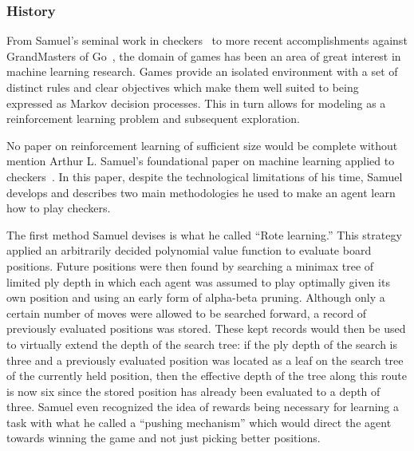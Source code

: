 

\subsubsection{History}

From Samuel's seminal work in checkers~\cite{samuel_checkers}
to more recent accomplishments against GrandMasters of
Go~\cite{deepmind_alphago},
the domain of games has been an area of great interest in machine learning
research.
%
Games provide an isolated environment with a set of distinct rules and clear
objectives which make them well suited to being expressed as Markov decision
processes.
%
This in turn allows for modeling as a reinforcement learning problem and
subsequent exploration.



No paper on reinforcement learning of sufficient size would be complete without
mention Arthur L. Samuel's foundational paper on machine learning applied to
checkers~\cite{samuel_checkers}.
%
In this paper,
despite the technological limitations of his time,
Samuel develops and describes two main methodologies he used to make an agent
learn how to play checkers.

The first method Samuel devises is what he called ``Rote learning.''
%
This strategy applied an arbitrarily decided polynomial value function
to evaluate board positions.
%
Future positions were then found by searching a minimax tree
of limited ply depth
in which each agent was assumed to play optimally given its own position
and using an early form of alpha-beta pruning.
%
Although only a certain number of moves were allowed to be searched forward,
a record of previously evaluated positions was stored.
%
These kept records would then be used to virtually extend the depth of the
search tree:
if the ply depth of the search is three and a previously evaluated position was
located as a leaf on the search tree of the currently held position,
then the effective depth of the tree along this route is now six since the
stored position has already been evaluated to a depth of three.
%
Samuel even recognized the idea of rewards being necessary for learning a task
with what he called a ``pushing mechanism'' which would direct the agent towards
winning the game and not just picking better positions.

